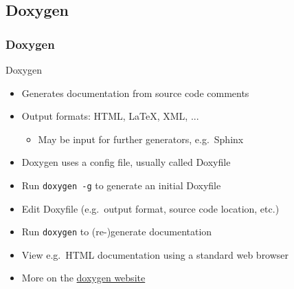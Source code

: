 \subsection[doxygen]{Doxygen}

\begin{frame}[fragile]
  \frametitle{Doxygen}
  \begin{block}{Doxygen}
    \begin{itemize}
      \item Generates documentation from source code comments
      \item Output formats: HTML, LaTeX, XML, ...
      \begin{itemize}
        \item May be input for further generators, e.g.\ Sphinx
      \end{itemize}
      \item Doxygen uses a config file, usually called Doxyfile
      \item Run \texttt{doxygen -g} to generate an initial Doxyfile
      \item Edit Doxyfile (e.g.\ output format, source code location, etc.)
      \item Run \texttt{doxygen} to (re-)generate documentation
      \item View e.g.\ HTML documentation using a standard web browser
      \item More on the \href{https://doxygen.nl/manual/starting.html}{doxygen website}
    \end{itemize}
  \end{block}
\end{frame}

